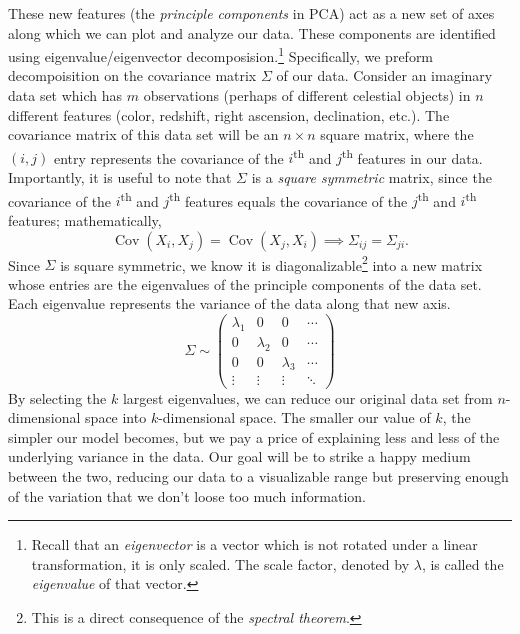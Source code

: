 These new features (the \emph{principle components} in PCA) act as a new set of axes along which we can plot and analyze our data. These components are identified using eigenvalue/eigenvector decomposision.\footnote{Recall that an \emph{eigenvector} is a vector which is not rotated under a linear transformation, it is only scaled. The scale factor, denoted by $\lambda$, is called the \emph{eigenvalue} of that vector.} Specifically, we preform decompoisition on the covariance matrix $\Sigma$ of our data. Consider an imaginary data set which has $m$ observations (perhaps of different celestial objects) in $n$ different features (color, redshift, right ascension, declination, etc.). The covariance matrix of this data set will be an $n \times n$ square matrix, where the $(i,j)$ entry represents the covariance of the $i$\textsuperscript{th} and $j$\textsuperscript{th} features in our data. Importantly, it is useful to note that $\Sigma$ is a \emph{square symmetric} matrix, since the covariance of the $i$\textsuperscript{th} and $j$\textsuperscript{th} features equals the covariance of the $j$\textsuperscript{th} and $i$\textsuperscript{th} features; mathematically,
\[ \operatorname{Cov}(X_i,X_j) = \operatorname{Cov}(X_j,X_i) \implies \Sigma_{ij} = \Sigma_{ji}. \]
Since $\Sigma$ is square symmetric, we know it is diagonalizable\footnote{This is a direct consequence of the \emph{spectral theorem}.} into a new matrix whose entries are the eigenvalues of the principle components of the data set. Each eigenvalue represents the variance of the data along that new axis.
\[ \Sigma \sim \begin{pmatrix}
\lambda_1 & 0 & 0 & \cdots \\
0 & \lambda_2 & 0 & \cdots \\
0 & 0 & \lambda_3 & \cdots \\
\vdots & \vdots & \vdots & \ddots
\end{pmatrix} \]
By selecting the $k$ largest eigenvalues, we can reduce our original data set from $n$-dimensional space into $k$-dimensional space. The smaller our value of $k$, the simpler our model becomes, but we pay a price of explaining less and less of the underlying variance in the data. Our goal will be to strike a happy medium between the two, reducing our data to a visualizable range but preserving enough of the variation that we don't loose too much information.

